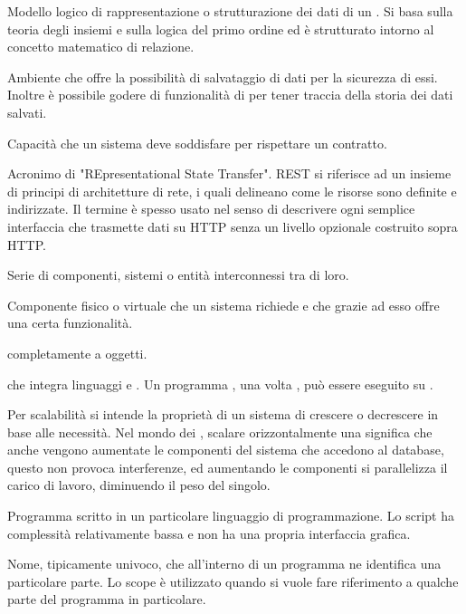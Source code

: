{Modello logico di rappresentazione o strutturazione dei dati di un . Si basa sulla teoria degli insiemi e sulla logica del primo ordine ed è strutturato intorno al concetto matematico di relazione.}

{Ambiente che offre la possibilità di salvataggio di dati per la sicurezza di essi. Inoltre è possibile godere di funzionalità di  per tener traccia della storia dei dati salvati.}

{Capacità che un sistema  deve soddisfare per rispettare un contratto.}

{Acronimo di "REpresentational State Transfer". REST si riferisce ad un insieme di principi di architetture di rete, i quali delineano come le risorse sono definite e indirizzate. Il termine è spesso usato nel senso di descrivere ogni semplice interfaccia che trasmette dati su HTTP senza un livello opzionale costruito sopra HTTP.}

{Serie di componenti, sistemi o entità interconnessi tra di loro.}

{Componente fisico o virtuale che un sistema richiede e che grazie ad esso offre una certa funzionalità.}

{ completamente a oggetti.}




{ che integra linguaggi  e . Un programma , una volta , può essere eseguito su .}

{Per scalabilità si intende la proprietà di un sistema di crescere o decrescere in base alle necessità. Nel mondo dei , scalare orizzontalmente una  significa che anche vengono aumentate le componenti del sistema che accedono al database, questo non provoca interferenze, ed aumentando le componenti si parallelizza il carico di lavoro, diminuendo il peso del singolo.}

{Programma scritto in un particolare linguaggio di programmazione. Lo script ha complessità relativamente bassa e non ha una propria interfaccia grafica.}

{Nome, tipicamente univoco, che all'interno di un programma ne identifica una particolare parte. Lo scope è utilizzato quando si vuole fare riferimento a qualche parte del programma in particolare.}

